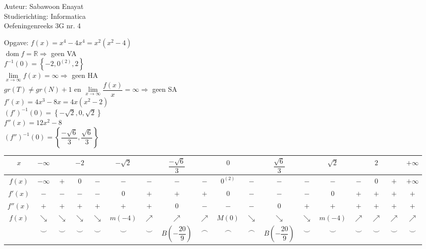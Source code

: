 \documentclass[a4paper]{article}
\begin{document}
  
\noindent \large Auteur: Sabawoon Enayat      \\
\noindent \large Studierichting: Informatica  \\
\noindent \large Oefeningenreeks 3G nr. 4 \\

\newcommand{\llim}{\lim\limits}

\medskip

\normalsize

Opgave: $f(x) = x^4 - 4x^4 = x^2 (x^2 - 4)$\\

$\operatorname{dom}f = \mathbb{R} \Rightarrow$ geen VA\\

$f^{-1}(0) = \left\{-2, 0^{(2)}, 2\right\}$\\

$\llim_{x\to\infty} f(x) = \infty \Rightarrow$ geen HA\\

$gr(T) \ne gr(N) + 1$ en $\llim_{x\to\infty} \dfrac{f(x)}{x} = \infty \Rightarrow$ geen SA\\

$f'(x) = 4x^3 - 8x = 4x\left(x^2 - 2\right)$\\

$(f')^{-1}(0) = \left\{-\sqrt{2}, 0, \sqrt{2}\right\}$\\

$f''(x) = 12x^2 - 8$\\

$(f'')^{-1}(0) = \left\{\dfrac{-\sqrt{6}}{3}, \dfrac{\sqrt{6}}{3}\right\}$\\

\begin{tabular}{c|ccccccccccccccccc}
	$x$      & $-\infty$ &  & $-2$ &  & $-\sqrt{2}$ &  & $\dfrac{-\sqrt{6}}{3}$ &  & $0$ &  & $\dfrac{\sqrt{6}}{3}$ &  & $\sqrt{2}$ & & $2$ & & $+\infty$ \\ \hline 
	$f(x)$   & $-\infty$ & $+$ & $0$ & $-$ & $-$ & $-$ & $-$ & $-$ & $0^{(2)}$ & $-$ & $-$ & $-$ & $-$ & $-$ & $0$ & $+$ & $+\infty$ \\ 
	$f'(x)$  & $-$ & $-$ & $-$ & $-$ & $0$ & $+$ & $+$ & $+$ & $0$ & $-$ & $-$ & $-$ & $0$ & $+$ & $+$ & $+$ & $+$\\
	$f''(x)$ & $+$ & $+$ & $+$ & $+$ & $+$ & $+$ & $0$ & $-$ & $-$ & $-$ & $0$ & $+$ & $+$ & $+$ & $+$ & $+$ & $+$ \\ \hline
	$f(x)$ & $\searrow$ & $\searrow$ & $\searrow$ & $\searrow$ & $m(-4)$ & $\nearrow$ & $\nearrow$ & $\nearrow$ & $M(0)$ & $\searrow$ & $\searrow$ & $\searrow$ & $m(-4)$ & $\nearrow$ & $\nearrow$ & $\nearrow$ & $\nearrow$ \\
		   & $\smile$ & $\smile$ & $\smile$ & $\smile$ & $\smile$ & $\smile$ & $B\left(-\dfrac{20}{9}\right)$ & $\frown$ & $\frown$ & $\frown$ & $B\left(-\dfrac{20}{9}\right)$ & $\smile$ & $\smile$ & $\smile$ & $\smile$ & $\smile$ & $\smile$ \\
\end{tabular} \\
\end{document}
